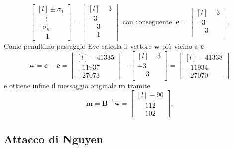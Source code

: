 \begin{exmp}
\begin{equation*}
    \begin{bmatrix*}[l]
        \pm\sigma_1 \\
        \phantom{\pm}\vdots \\
        \pm\sigma_n \\
        \phantom{\pm}1
    \end{bmatrix*}
    =
    \begin{bmatrix*}[l]
        \phantom{-}3\\[0.1cm]
                  -3\\[0.1cm]
        \phantom{-}3\\[0.1cm]
        \phantom{-}1\\
    \end{bmatrix*}
    \ \text{ con conseguente } \
    \mathbf{e} =
    \begin{bmatrix*}[l]
        \phantom{-}3\\[0.1cm]
                  -3\\[0.1cm]
        \phantom{-}3\\[0.1cm]
    \end{bmatrix*}.
\end{equation*}
Come penultimo passaggio Eve calcola il vettore $\mathbf{w}$ più vicino a $\mathbf{c}$
\begin{equation*}
    \mathbf{w} = \mathbf{c} - \mathbf{e} =
    \begin{bmatrix*}[l]
        -41335\\
        -11937\\
        -27073
    \end{bmatrix*} -
    \begin{bmatrix*}[l]
        \phantom{-}3\\
                  -3\\
        \phantom{-}3\\
    \end{bmatrix*} =
    \begin{bmatrix*}[l]
        -41338\\
        -11934\\
        -27070
    \end{bmatrix*} 
\end{equation*}
e ottiene infine il messaggio originale $\mathbf{m}$ tramite
\begin{equation*}
    \mathbf{m} = \mathbf{B}^{-1} \mathbf{w} =
    \begin{bmatrix*}[l]
        -90\\
        \phantom{-}112\\
        \phantom{-}102
    \end{bmatrix*}.
\end{equation*}
\end{exmp}
\subsection{Attacco di Nguyen}